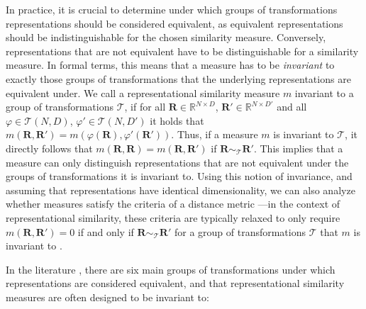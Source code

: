 \documentclass{article}
\newcommand{\Real}{\mathbb{R}}
\newcommand{\R}{\bm{R}}
\newcommand{\Rp}{\bm{R'}}
\begin{document}
In practice, it is crucial to determine under which groups of transformations representations should be considered equivalent, as equivalent representations should be indistinguishable for the chosen similarity measure.
Conversely, representations that are not equivalent have to be distinguishable for a similarity measure.
In formal terms, this means that a measure has to be \emph{invariant} to exactly those groups of transformations that the underlying representations are equivalent under.
We call a representational similarity measure $m$ invariant to a group of transformations $\mathcal{T}$, if for all $\R\in\Real^{N\times D}$, $\Rp\in\Real^{N\times D'}$ and all $\varphi \in \mathcal{T}(N,D)$, $\varphi' \in \mathcal{T}(N,D')$ it holds that $m(\R,\Rp) = m(\varphi(\R),\varphi'(\Rp))$.
Thus, if a measure $m$ is invariant to $\mathcal{T}$, it directly follows that $m(\R,\R) = m(\R, \Rp)$ if $\R\sim_\mathcal{T}\Rp$.
This implies that a measure can only distinguish representations that are not equivalent under the groups of transformations it is invariant to.
Using this notion of invariance, and assuming that representations have identical dimensionality, we can also analyze whether measures satisfy the criteria of a distance metric%
---in the context of representational similarity, these criteria are typically relaxed to only require $m(\R,\Rp)=0$ if and only if $\R\sim_{\mathcal{T}} \Rp$ for a group of transformations $\mathcal{T}$ that $m$ is invariant to \cite[Apx. A.2]{williams_generalized_2022}. %


In the literature \cite{kornblith_similarity_2019,williams_generalized_2022,raghu_svcca_2017,li_convergent_2016}, there are six main groups of transformations under which representations are considered equivalent, and that representational similarity measures are often designed to be invariant to:
\end{document}
